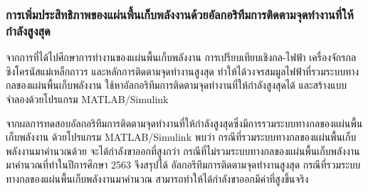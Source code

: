 \documentclass[11pt,a4paper]{article}
\begin{document}
\subsubsection{การเพิ่มประสิทธิภาพของแผ่นพื้นเก็บพลังงานด้วยอัลกอริทึมการติดตามจุดทำงานที่ให้กำลังสูงสุด}
จากการที่ได้ไปศึกษาการทำงานของแผ่นพื้นเก็บพลังงาน การเปรียบเทียบเชิงกล-ไฟฟ้า เครื่องจักรกลซิงโครนัสแม่เหล็กถาวร และหลักการติดตามจุดทำงานสูงสุด
ทำให้ได้วงจรสมมูลไฟฟ้าที่รวมระบบทางกลของแผ่นพื้นเก็บพลังงาน ใช้หาอัลกอริทึมการติดตามจุดทำงานที่ให้กำลังสูงสุดได้ และสร้างแบบจำลองด้วยโปรแกรม MATLAB/Simulink

จากผลการทดสอบอัลกอริทึมการติดตามจุดทำงานที่ให้กำลังสูงสุดซึ่งมีการรวมระบบทางกลของแผ่นพื้นเก็บพลังงาน ด้วยโปรแกรม MATLAB/Simulink
พบว่า กรณีที่รวมระบบทางกลของแผ่นพื้นเก็บพลังงานมาคำนวณด้วย จะได้กำลังขาออกที่สูงกว่า กรณีที่ไม่รวมระบบทางกลของแผ่นพื้นเก็บพลังงานมาคำนวณที่ทำในปีการศึกษา 2563
จึงสรุปได้ อัลกอริทึมการติดตามจุดทำงานสูงสุด กรณีที่รวมระบบทางกลของแผ่นพื้นเก็บพลังงานมาคำนวณ สามารถทำให้ได้กำลังขาออกมีค่าที่สูงขึ้นจริง
\end{document}
